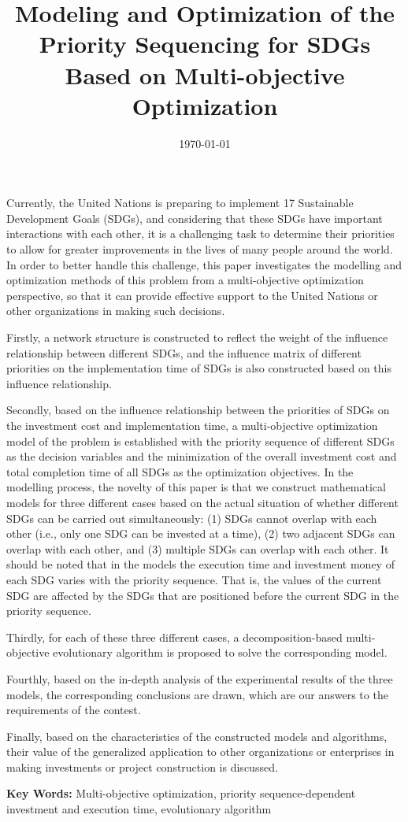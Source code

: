 \documentclass[10pt]{mcmthesis}
\title{\textbf{ Modeling and Optimization of the Priority Sequencing for SDGs Based on Multi-objective Optimization}}
\author{\team}
\date{\today}
\begin{document}
\begin{summary}
Currently, the United Nations is preparing to implement 17 Sustainable Development Goals (SDGs), and considering that these SDGs have important interactions with each other, it is a challenging task to determine their priorities to allow for greater improvements in the lives of many people around the world. In order to better handle this challenge, this paper investigates the modelling and optimization methods of this problem from a multi-objective optimization perspective, so that it can provide effective support to the United Nations or other organizations in making such decisions.

Firstly, a network structure is constructed to reflect the weight of the influence relationship between different SDGs, and the influence matrix of different priorities on the implementation time of SDGs is also constructed based on this influence relationship.

Secondly, based on the influence relationship between the priorities of SDGs on the investment cost and implementation time, a multi-objective optimization model of the problem is established with the priority sequence of different SDGs as the decision variables and the minimization of the overall investment cost and total completion time of all SDGs as the optimization objectives. In the modelling process, the novelty of this paper is that we construct mathematical models for three different cases based on the actual situation of whether different SDGs can be carried out simultaneously: (1) SDGs cannot overlap with each other (i.e., only one SDG can be invested at a time), (2) two adjacent SDGs can overlap with each other, and (3) multiple SDGs can overlap with each other. It should be noted that in the models the execution time and investment money of each SDG varies with the priority sequence. That is, the values of the current SDG are affected by the SDGs that are positioned before the current SDG in the priority sequence.

Thirdly, for each of these three different cases, a decomposition-based multi-objective evolutionary algorithm is proposed to solve the corresponding model. 

Fourthly, based on the in-depth analysis of the experimental results of the three models, the corresponding conclusions are drawn, which are our answers to the requirements of the contest.

Finally, based on the characteristics of the constructed models and algorithms, their value of the generalized application to other organizations or enterprises in making investments or project construction is discussed.


\noindent
\textbf{Key Words:}
Multi-objective optimization, priority sequence-dependent investment and execution time, evolutionary algorithm

\end{summary}
\end{document}
